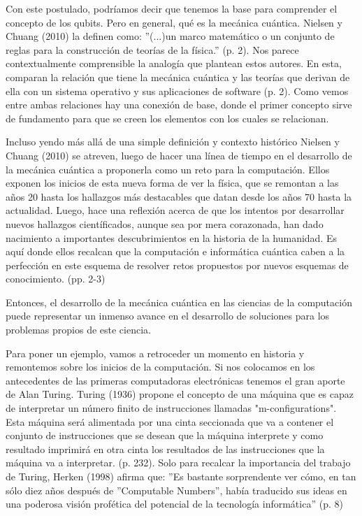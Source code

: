 \documentclass[11pt,a4paper]{article}
\begin{document}
Con este postulado, podríamos decir que tenemos la base para comprender el concepto de los qubits. Pero en general, qué es la mecánica cuántica. Nielsen y Chuang (2010) la definen como: ''(...)un marco matemático o un conjunto de reglas para la construcción de teorías de la física.'' (p. 2). Nos parece contextualmente comprensible la analogía que plantean estos autores. En esta, comparan la relación que tiene la mecánica cuántica y las teorías que derivan de ella con un sistema operativo y sus aplicaciones de software (p. 2). Como vemos entre ambas relaciones hay una conexión de base, donde el primer concepto sirve de fundamento para que se creen los elementos con los cuales se relacionan.

Incluso yendo más allá de una simple definición y contexto histórico Nielsen y Chuang (2010) se atreven, luego de hacer una línea de tiempo en el desarrollo de la mecánica cuántica a proponerla como un reto para la computación. Ellos exponen los inicios de esta nueva forma de ver la física, que se remontan a las años 20 hasta los hallazgos más destacables que datan desde los años 70 hasta la actualidad. Luego, hace una reflexión acerca de que los intentos por desarrollar nuevos hallazgos científicados, aunque sea por mera corazonada, han dado nacimiento a importantes descubrimientos en la historia de la humanidad. Es aquí donde ellos recalcan que la computación e informática cuántica caben a la perfección en este esquema de resolver retos propuestos por nuevos esquemas de conocimiento. (pp. 2-3)

Entonces, el desarrollo de la mecánica cuántica en las ciencias de la computación puede representar un inmenso avance en el desarrollo de soluciones para los problemas propios de este ciencia. 

Para poner un ejemplo, vamos a retroceder un momento en historia y remontemos sobre los inicios de la computación. Si nos colocamos en los antecedentes de las primeras computadoras electrónicas tenemos el gran aporte de Alan Turing. Turing (1936) propone el concepto de una máquina que es capaz de interpretar un número finito de instrucciones llamadas "m-configurations". Esta máquina será alimentada por una cinta seccionada que va a contener el conjunto de instrucciones que se desean que la máquina interprete y como resultado imprimirá en otra cinta los resultados de las instrucciones que la máquina va a interpretar. (p. 232). Solo para recalcar la importancia del trabajo de Turing, Herken (1998) afirma que: ''Es bastante sorprendente ver cómo, en tan sólo diez años después de ''Computable Numbers'', había traducido sus ideas en una poderosa visión profética del potencial de la tecnología informática'' (p. 8) 
\end{document}
